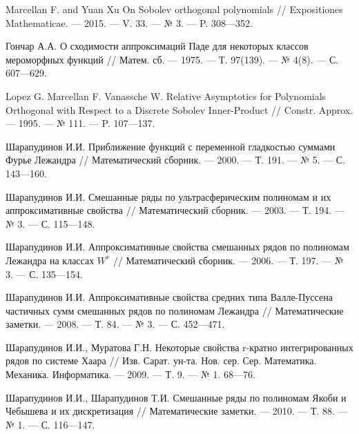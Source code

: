 \begin{thebibliography}{99}
Marcellan F. and Yuan Xu On Sobolev orthogonal polynomials // Expositiones Mathematicae. --- 2015. --- V. 33. --- № 3. --- P. 308---352.






Гончар А.А. О сходимости аппроксимаций Паде для некоторых классов мероморфных функций // Матем. сб. --- 1975. --- Т. 97(139). --- № 4(8). --- С. 607---629.






Lopez G. Marcellan F. Vanassche W. Relative Asymptotics for Polynomials Orthogonal with Respect to a Discrete Sobolev Inner-Product // Constr. Approx. --- 1995. --- № 111. --- P. 107---137.





Шарапудинов И.И. Приближение функций с переменной гладкостью суммами Фурье Лежандра // Математический сборник. --- 2000. --- Т. 191. --- № 5. --- С. 143---160.






Шарапудинов И.И. Смешанные ряды по ультрасферическим полиномам и их аппроксимативные свойства // Математический сборник. --- 2003. --- Т. 194. --- № 3. --- С. 115---148.






Шарапудинов И.И. Аппроксимативные свойства смешанных рядов по полиномам Лежандра на классах $W^r$ // Математический сборник. --- 2006. --- Т. 197. --- № 3. --- С. 135---154.





Шарапудинов И.И. Аппроксимативные свойства средних типа Валле-Пуссена частичных сумм смешанных рядов по полиномам Лежандра // Математические заметки. --- 2008. --- Т. 84. --- № 3. --- С. 452---471.





Шарапудинов И.И., Муратова Г.Н. Некоторые свойства r-кратно интегрированных рядов по системе Хаара // Изв. Сарат. ун-та. Нов. сер. Сер. Математика. Механика. Информатика. --- 2009. --- Т. 9. --- № 1. 68---76.






Шарапудинов И.И., Шарапудинов Т.И. Смешанные ряды по полиномам Якоби и Чебышева и их дискретизация // Математические заметки. --- 2010. --- Т. 88. --- № 1. --- С. 116---147.







\end{thebibliography}
